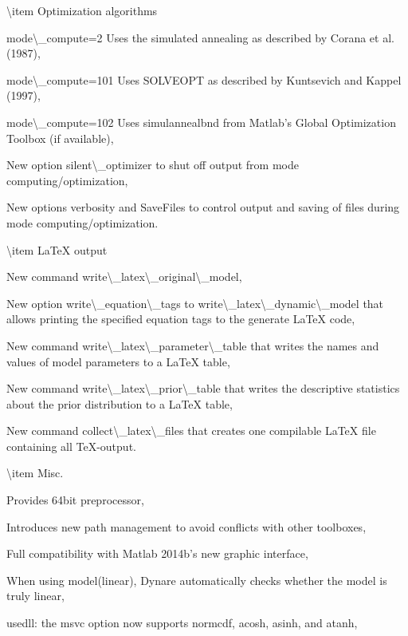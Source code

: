 \documentclass[10pt,math=newtx,citestyle=gb7714-2015,bibstyle=gb7714-2015]{elegantbook}
\begin{document}
	
	\textbackslash{}item Optimization algorithms
	
	
	mode\textbackslash{}\_compute=2 Uses the simulated annealing as described by Corana et al. (1987),
	
	
	mode\textbackslash{}\_compute=101 Uses SOLVEOPT as described by Kuntsevich and Kappel (1997),
	
	
	mode\textbackslash{}\_compute=102 Uses simulannealbnd from Matlab's Global Optimization Toolbox (if available),
	
	
	New option silent\textbackslash{}\_optimizer to shut off output from mode computing/optimization,
	
	
	New options verbosity and SaveFiles to control output and saving of files during mode computing/optimization.
	
	
	
	
	\textbackslash{}item LaTeX output
	
	
	New command write\textbackslash{}\_latex\textbackslash{}\_original\textbackslash{}\_model,
	
	
	New option write\textbackslash{}\_equation\textbackslash{}\_tags to write\textbackslash{}\_latex\textbackslash{}\_dynamic\textbackslash{}\_model that allows printing the specified equation tags to the generate
	LaTeX code,
	
	
	New command write\textbackslash{}\_latex\textbackslash{}\_parameter\textbackslash{}\_table that writes the names and values of model parameters to a LaTeX table,
	
	
	New command write\textbackslash{}\_latex\textbackslash{}\_prior\textbackslash{}\_table that writes the descriptive statistics about the prior distribution to a LaTeX table,
	
	
	New command collect\textbackslash{}\_latex\textbackslash{}\_files that creates one compilable LaTeX file containing all TeX-output.
	
	
	
	
	\textbackslash{}item Misc.
	
	
	Provides 64bit preprocessor,
	
	
	Introduces new path management to avoid conflicts with other toolboxes,
	
	
	Full compatibility with Matlab 2014b's new graphic interface,
	
	
	When using model(linear), Dynare automatically checks whether the model is truly linear,
	
	
	usedll: the msvc option now supports normcdf, acosh, asinh, and atanh,
	
\end{document}
